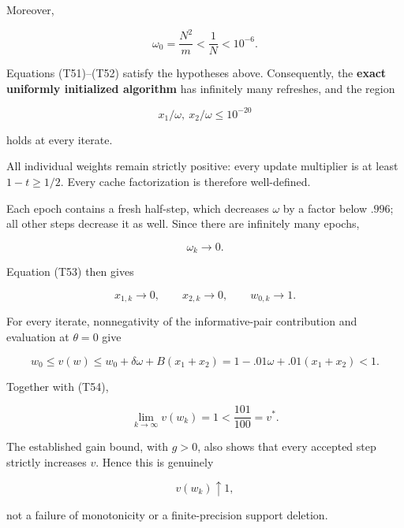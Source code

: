Moreover,

\[
\omega_0=\frac{N^2}{m}<\frac1N<10^{-6}.
\tag{T52}
\]

Equations (T51)–(T52) satisfy the hypotheses above. Consequently, the \textbf{exact uniformly initialized algorithm} has infinitely many refreshes, and the region

\[
x_1/\omega,\ x_2/\omega\le10^{-20}
\tag{T53}
\]

holds at every iterate.

All individual weights remain strictly positive: every update multiplier is at least \(1-t\ge1/2\). Every cache factorization is therefore well-defined.

Each epoch contains a fresh half-step, which decreases \(\omega\) by a factor below \(.996\); all other steps decrease it as well. Since there are infinitely many epochs,

\[
\omega_k\longrightarrow0.
\]

Equation (T53) then gives

\[
x_{1,k}\longrightarrow0,\qquad
x_{2,k}\longrightarrow0,\qquad
w_{0,k}\longrightarrow1.
\tag{T54}
\]

For every iterate, nonnegativity of the informative-pair contribution and evaluation at \(\theta=0\) give

\[
w_0\le v(w)
\le w_0+\delta\omega+B(x_1+x_2)
=1-.01\omega+.01(x_1+x_2)<1.
\tag{T55}
\]

Together with (T54),

\[
\boxed{\lim_{k\to\infty}v(w_k)=1<\frac{101}{100}=v^*.}
\tag{T56}
\]

The established gain bound, with \(g>0\), also shows that every accepted step strictly increases \(v\). Hence this is genuinely

\[
v(w_k)\uparrow1,
\]

not a failure of monotonicity or a finite-precision support deletion.


